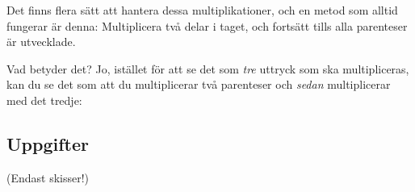 Det finns flera sätt att hantera dessa multiplikationer, och en metod som alltid fungerar är denna:
Multiplicera två delar i taget, och fortsätt tills alla parenteser är utvecklade.

Vad betyder det?
Jo, istället för att se det som \emph{tre} uttryck som ska multipliceras, kan du se det som att du multiplicerar två parenteser och \emph{sedan} multiplicerar med det tredje:

\smallskip
{}
\smallskip

\subsection{Uppgifter}

(Endast skisser!)

